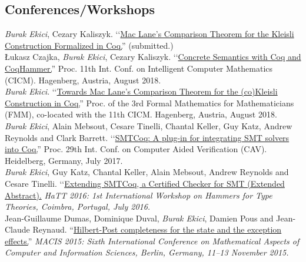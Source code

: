 \documentclass[12pt, a4paper]{article}
\newcommand{\years}[1]{\marginnote{\scriptsize #1}}
\begin{document}
\subsection*{Conferences/Workshops}
\years{\normalsize2018}
\emph{Burak Ekici}, Cezary Kaliszyk.
\lq\lq{\href{http://ekiciburak.github.io/}{Mac Lane’s Comparison Theorem for the Kleisli
Construction Formalized in Coq.}}'' (submitted.)
\\[0.25cm]
\years{\normalsize2018}
\L ukasz Czajka, \emph{Burak Ekici}, Cezary Kaliszyk.
\lq\lq{\href{https://www.mimuw.edu.pl/~lukaszcz/cicm2018.pdf}{Concrete Semantics with Coq and CoqHammer.}}''
Proc. 11th Int. Conf. on Intelligent Computer Mathematics (CICM). Hagenberg, Austria, August 2018.
\\[0.25cm]
\years{\normalsize2018}
\emph{Burak Ekici}.
\lq\lq{\href{https://www.cicm-conference.org/2018/infproc/paper11.pdf}{Towards Mac Lane's Comparison Theorem for the (co)Kleisli Construction in Coq.}}''
Proc. of the 3rd Formal Mathematics for Mathematicians (FMM), co-located with the 11th CICM. Hagenberg, Austria, August 2018.
\\[0.25cm]
\years{\normalsize2017}
\emph{Burak Ekici}, Alain Mebsout, Cesare Tinelli,
Chantal Keller, Guy Katz, Andrew Reynolds and Clark Barrett. 
\lq\lq{\href{http://homepage.divms.uiowa.edu/~tinelli/papers/EkiEtAl-CAV-17.pdf}{SMTCoq: A plug-in for integrating SMT solvers into Coq.}}''
Proc. 29th Int. Conf. on Computer Aided Verification (CAV). Heidelberg, Germany, July 2017.
\\[0.25cm]
\years{\normalsize2016}
\emph{Burak Ekici}, Guy Katz, Chantal Keller, Alain Mebsout, Andrew Reynolds and Cesare Tinelli.
\lq\lq{\href{http://eptcs.web.cse.unsw.edu.au/paper.cgi?HaTT2016.5}{Extending SMTCoq, a Certified Checker for SMT (Extended Abstract).}}
\emph{HaTT 2016: 1st International Workshop on Hammers for Type Theories, Coimbra, Portugal, July 2016.}
\\[0.25cm]
\years{\normalsize2015}
Jean-Guillaume Dumas, Dominique Duval, \emph{Burak Ekici}, Damien Pous and Jean-Claude Reynaud. ``\href{https://hal.archives-ouvertes.fr/hal-01121924}{Hilbert-Post completeness for the state and the exception effects.}''
\emph{MACIS 2015: Sixth International Conference on Mathematical Aspects of Computer and Information Sciences, Berlin,
Germany, 11–13 November 2015.}
\\[0.25cm]
\end{document}
